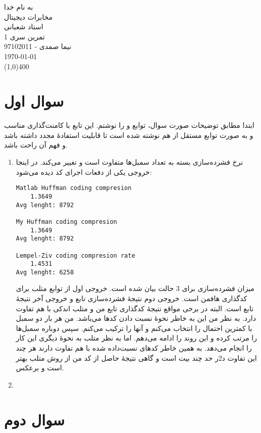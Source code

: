 \documentclass[a4paper]{article}
\begin{document}
\begin{center}
\begin{bf}
\huge{به نام خدا} \\
\vspace*{3mm}
\large{مخابرات دیجیتال}\\
\vspace*{1.5mm}
\large{استاد شعبانی} \\
\vspace*{1.5mm}
\large{تمرین سری  1} \\
\vspace*{1.5mm}
\large{نیما صمدی - 97102011} \\
\vspace*{1.5mm}
\today \\
\vspace*{1.5mm}
\line(1,0){400}
\vspace*{5mm}
\end{bf}
\end{center}
\section{سوال اول}
ابتدا مطابق توضیحات صورت سوال، توابع 
و
را نوشتم. این تابع با کامنت‌گذاری مناسب و به صورت توابع مستقل از هم نوشته شده است تا قابلیت استفادۀ مجدد داشته باشد و فهم آن راحت باشد. 

\begin{enumerate}[1)]
\item نرخ فشرده‌سازی بسته به تعداد سمبل‌ها متفاوت است و تغییر می‌کند. در اینجا خروجی یکی از دفعات اجرای کد دیده می‌شود:
\begin{latin}
\begin{Verbatim}[frame=single,
				baselinestretch=1.2,
				xleftmargin=1.5cm,
				xrightmargin=1.5cm,
				breaklines=true]
Matlab Huffman coding compresion
    1.3649
Avg lenght: 8792

My Huffman coding compresion
    1.3649
Avg lenght: 8792

Lempel-Ziv coding compresion rate
    1.4531
Avg lenght: 6258
\end{Verbatim}
\end{latin}
میزان فشرده‌سازی برای 3 حالت بیان شده است. خروجی اول از توابع متلب برای کدگذاری هافمن است. خروجی دوم نتیجۀ فشرده‌سازی تابع 
و خروجی آخر نتیجۀ تابع
است. البته در برخی مواقع نتیجۀ کدگذاری 
تابع من و متلب اندکی با هم تفاوت دارد. به نظر من این به خاطر نحوۀ نسبت دادن کدها می‌باشد. من هر بار دو سمبل با کمترین احتمال را انتخاب می‌کنم و آنها را ترکیب می‌کنم. سپس دوباره سمبل‌ها را مرتب کرده و این روند را ادامه می‌دهم. اما به نظر متلب به نحوۀ دیگری این کار را انجام می‌دهد. به همین خاطر کد‌های نسبت‌داده شده با هم تفاوت دارند هر چند این تفاوت د2ر حد چند بیت است و گاهی نتیجۀ حاصل از کد من از روش متلب بهتر است و برعکس. 
\item 
\end{enumerate}
\section{سوال دوم}
\end{document}

